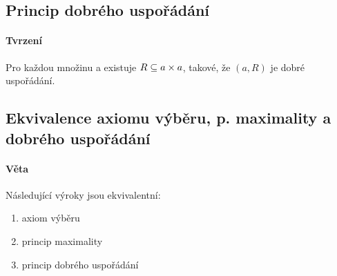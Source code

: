\documentclass[a4paper,12pt,titlepage]{article}
\begin{document}
\subsection{Princip dobrého uspořádání}
\setcounter{equation}{0}
\paragraph{Tvrzení}
Pro každou množinu a existuje $R \subseteq a \times a$, takové, že $(a, R)$ je dobré uspořádání.

\subsection{Ekvivalence axiomu výběru, p. maximality a dobrého uspořádání}
\setcounter{equation}{0}
\paragraph{Věta}
Následující výroky jsou ekvivalentní:
\begin{enumerate}
	\item axiom výběru
	\item princip maximality
	\item princip dobrého uspořádání
\end{enumerate}
\end{document}

